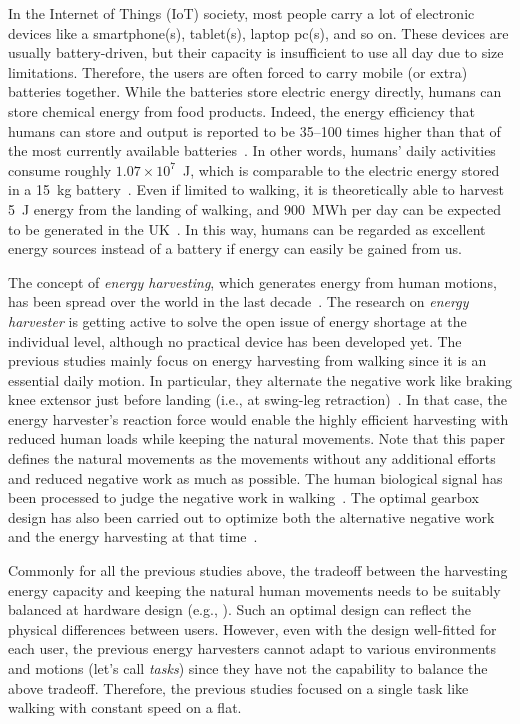 \documentclass[twocolumn]{svjour3}          %
\begin{document}
In the Internet of Things (IoT) society, most people carry a lot of electronic devices like a smartphone(s), tablet(s), laptop pc(s), and so on.
These devices are usually battery-driven, but their capacity is insufficient to use all day due to size limitations.
Therefore, the users are often forced to carry mobile (or extra) batteries together.
While the batteries store electric energy directly, humans can store chemical energy from food products.
Indeed, the energy efficiency that humans can store and output is reported to be 35--100 times higher than that of the most currently available batteries~\cite{rome2005generating}.
In other words, humans' daily activities consume roughly $1.07 \times 10^7$~J, which is comparable to the electric energy stored in a 15~kg battery~\cite{riemer2011biomechanical,schertzer2015harvesting}.
Even if limited to walking, it is theoretically able to harvest 5~J energy from the landing of walking, and 900~MWh per day can be expected to be generated in the UK~\cite{partridge2016analysis}.
In this way, humans can be regarded as excellent energy sources instead of a battery if energy can easily be gained from us.

The concept of \textit{energy harvesting}, which generates energy from human motions, has been spread over the world in the last decade~\cite{rome2005generating,donelan2008biomechanical,shepertycky2015generating}.
The research on \textit{energy harvester} is getting active to solve the open issue of energy shortage at the individual level, although no practical device has been developed yet.
The previous studies mainly focus on energy harvesting from walking since it is an essential daily motion.
In particular, they alternate the negative work like braking knee extensor just before landing (i.e., at swing-leg retraction)~\cite{devita2007muscles,winter2009biomechanics}.
In that case, the energy harvester's reaction force would enable the highly efficient harvesting with reduced human loads while keeping the natural movements.
Note that this paper defines the natural movements as the movements without any additional efforts and reduced negative work as much as possible.
The human biological signal has been processed to judge the negative work in walking~\cite{selinger2015myoelectric}.
The optimal gearbox design has also been carried out to optimize both the alternative negative work and the energy harvesting at that time~\cite{jhalani2012optimal}.

Commonly for all the previous studies above, the tradeoff between the harvesting energy capacity and keeping the natural human movements needs to be suitably balanced at hardware design (e.g., \cite{jhalani2012optimal}).
Such an optimal design can reflect the physical differences between users.
However, even with the design well-fitted for each user, the previous energy harvesters cannot adapt to various environments and motions (let's call \textit{tasks}) since they have not the capability to balance the above tradeoff.
Therefore, the previous studies focused on a single task like walking with constant speed on a flat.
\end{document}
